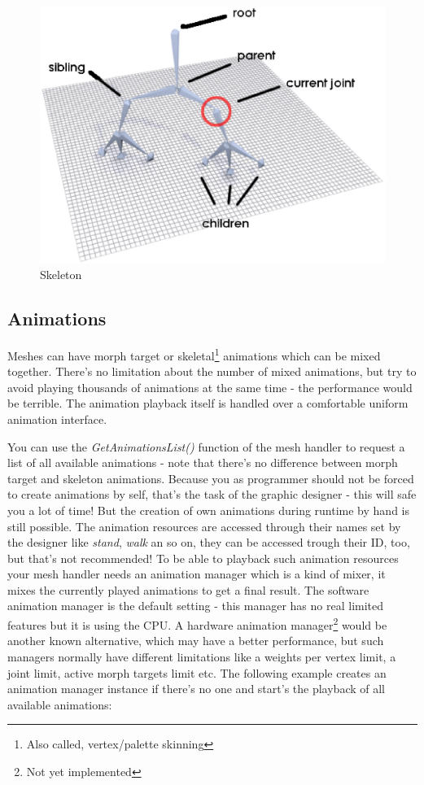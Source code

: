 \begin{figure}
	\centering
	\includegraphics[scale=0.5]{pics/Skeleton.eps}
	\caption{Skeleton}
	\label{fig:Skeleton}
\end{figure}




\subsection{Animations}
Meshes can have morph target or skeletal\footnote{Also called, vertex/palette skinning} animations which can be mixed together. There's no limitation about the number of mixed animations, but try to avoid playing thousands of animations at the same time - the performance would be terrible. The animation playback itself is handled over a comfortable uniform animation interface.

You can use the \emph{GetAnimationsList()} function of the mesh handler to request a list of all available animations - note that there's no difference between morph target and skeleton animations. Because you as programmer should not be forced to create animations by self, that's the task of the graphic designer - this will safe you a lot of time! But the creation of own animations during runtime by hand is still possible. The animation resources are accessed through their names set by the designer like \emph{stand}, \emph{walk} an so on, they can be accessed trough their ID, too, but that's not recommended! To be able to playback such animation resources your mesh handler needs an animation manager which is a kind of mixer, it mixes the currently played animations to get a final result. The software animation manager is the default setting - this manager has no real limited features but it is using the CPU. A hardware animation manager\footnote{Not yet implemented} would be another known alternative, which may have a better performance, but such managers normally have different limitations like a weights per vertex limit, a joint limit, active morph targets limit etc. The following example creates an animation manager instance if there's no one and start's the playback of all available animations:

